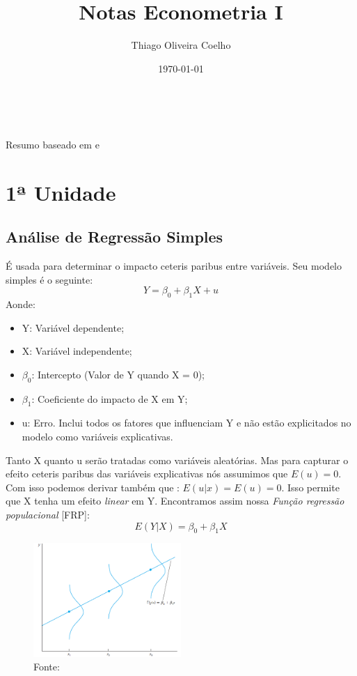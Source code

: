 \documentclass[12pt,a4paper,oneside,brazil]{abntex2}
\title{Notas Econometria I}
\author{Thiago Oliveira Coelho}
\date{\today}
\begin{document}
\pagestyle{plain}

\maketitle\
\begin{center}
Resumo baseado em \cite{gujarati} e \cite{wooldridge}
\end{center}
\tableofcontents

\chapter{1ª Unidade}

\section{Análise de Regressão Simples}
É usada para determinar o impacto ceteris paribus entre variáveis. Seu modelo simples é o seguinte:
\[ Y = \beta_0 + \beta_1 X + u \]
Aonde:
\begin{itemize}
\item Y: Variável dependente;
\item X: Variável independente;
\item $\beta_0$: Intercepto (Valor de Y quando X = 0);
\item $\beta_1$: Coeficiente do impacto de X em Y;
\item u: Erro. Inclui todos os fatores que influenciam Y e não estão explicitados no modelo como variáveis explicativas.
\end{itemize}
Tanto X quanto u serão tratadas como variáveis aleatórias. Mas para capturar o efeito ceteris paribus das variáveis explicativas nós assumimos que $E(u) = 0$. Com isso podemos derivar também que : $E(u|x) = E(u) = 0$. Isso permite que X tenha um efeito \emph{linear} em Y. \newline
Encontramos assim nossa \emph{Função regressão populacional} [FRP]:
\[ E(Y|X) = \beta_0 + \beta_1 X\]

\begin{figure}
  \includegraphics[width=0.5\textwidth]{OLS.png}
  \centering
  \caption{Fonte: \cite{wooldridge}}
\end{figure}
\end{document}
